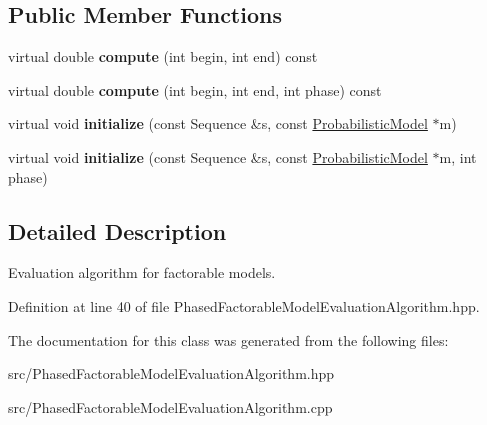 \subsection*{Public Member Functions}
\begin{DoxyCompactItemize}
\item 
\mbox{\label{classtops_1_1PhasedFactorableModelEvaluationAlgorithm_adf87781cd5a9f3fb62d80529210e0fff}} 
virtual double {\bfseries compute} (int begin, int end) const
\item 
\mbox{\label{classtops_1_1PhasedFactorableModelEvaluationAlgorithm_a0086e8586dc4b63ad2673efd407dbb93}} 
virtual double {\bfseries compute} (int begin, int end, int phase) const
\item 
\mbox{\label{classtops_1_1PhasedFactorableModelEvaluationAlgorithm_aa8a2d86689170cf9fc74b7dfc949db62}} 
virtual void {\bfseries initialize} (const Sequence \&s, const \hyperlink{classtops_1_1ProbabilisticModel}{Probabilistic\+Model} $\ast$m)
\item 
\mbox{\label{classtops_1_1PhasedFactorableModelEvaluationAlgorithm_a88ba9f6092daeb98aced6f9d7b98c6bd}} 
virtual void {\bfseries initialize} (const Sequence \&s, const \hyperlink{classtops_1_1ProbabilisticModel}{Probabilistic\+Model} $\ast$m, int phase)
\end{DoxyCompactItemize}


\subsection{Detailed Description}
Evaluation algorithm for factorable models. 

Definition at line 40 of file Phased\+Factorable\+Model\+Evaluation\+Algorithm.\+hpp.



The documentation for this class was generated from the following files\+:\begin{DoxyCompactItemize}
\item 
src/Phased\+Factorable\+Model\+Evaluation\+Algorithm.\+hpp\item 
src/Phased\+Factorable\+Model\+Evaluation\+Algorithm.\+cpp\end{DoxyCompactItemize}
